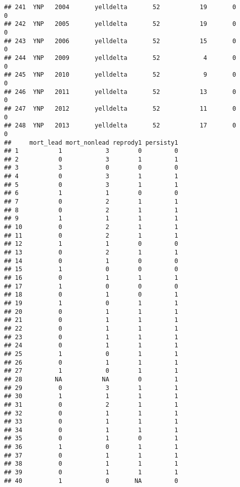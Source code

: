 \documentclass[
]{article}
\begin{document}
\begin{verbatim}
## 241  YNP   2004       yelldelta       52           19       0        0
## 242  YNP   2005       yelldelta       52           19       0        0
## 243  YNP   2006       yelldelta       52           15       0        0
## 244  YNP   2009       yelldelta       52            4       0        0
## 245  YNP   2010       yelldelta       52            9       0        0
## 246  YNP   2011       yelldelta       52           13       0        0
## 247  YNP   2012       yelldelta       52           11       0        0
## 248  YNP   2013       yelldelta       52           17       0        0
##     mort_lead mort_nonlead reprody1 persisty1
## 1           1            3        0         0
## 2           0            3        1         1
## 3           3            0        0         0
## 4           0            3        1         1
## 5           0            3        1         1
## 6           1            1        0         0
## 7           0            2        1         1
## 8           0            2        1         1
## 9           1            1        1         1
## 10          0            2        1         1
## 11          0            2        1         1
## 12          1            1        0         0
## 13          0            2        1         1
## 14          0            1        0         0
## 15          1            0        0         0
## 16          0            1        1         1
## 17          1            0        0         0
## 18          0            1        0         1
## 19          1            0        1         1
## 20          0            1        1         1
## 21          0            1        1         1
## 22          0            1        1         1
## 23          0            1        1         1
## 24          0            1        1         1
## 25          1            0        1         1
## 26          0            1        1         1
## 27          1            0        1         1
## 28         NA           NA        0         1
## 29          0            3        1         1
## 30          1            1        1         1
## 31          0            2        1         1
## 32          0            1        1         1
## 33          0            1        1         1
## 34          0            1        1         1
## 35          0            1        0         1
## 36          1            0        1         1
## 37          0            1        1         1
## 38          0            1        1         1
## 39          0            1        1         1
## 40          1            0       NA         0

\end{verbatim}
\end{document}
